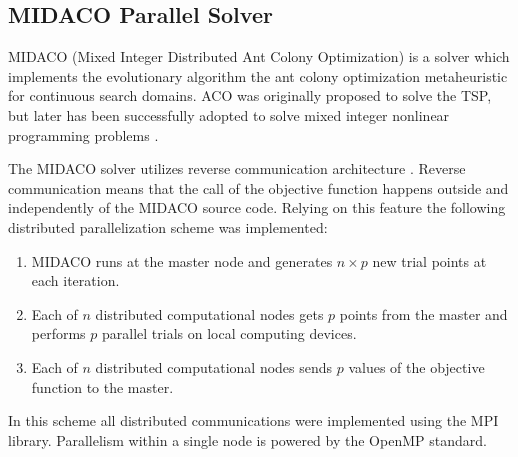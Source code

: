 \documentclass{svproc}
\begin{document}
\subsection{MIDACO Parallel Solver}
MIDACO (Mixed Integer Distributed Ant Colony Optimization) \cite{Schlueter2012} is a solver which implements the evolutionary algorithm
the ant colony optimization metaheuristic for continuous search domains. ACO was originally
proposed to solve the TSP, but later has been successfully adopted to solve mixed integer nonlinear programming problems \cite{SCHLUTER2009}.

The MIDACO solver utilizes reverse communication architecture \cite{Schlueter2012}.
Reverse communication means that the call of the objective function happens outside and independently of the MIDACO source code.
Relying on this feature the following distributed parallelization scheme was implemented:
\begin{enumerate}
  \item MIDACO runs at the master node and generates \(n \times p\) new trial points at each iteration.
  \item Each of \(n\) distributed computational nodes gets \(p\) points from the master and performs \(p\) parallel trials on local computing devices.
  \item Each of \(n\) distributed computational nodes sends \(p\) values of the objective function to the master.
\end{enumerate}

In this scheme all distributed communications were implemented using the MPI library.
Parallelism within a single node is powered by the OpenMP standard.
\end{document}
